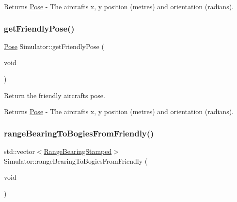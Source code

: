 \begin{DoxyReturn}{Returns}
\hyperlink{structPose}{Pose} -\/ The aircraft\textquotesingle{}s x, y position (metres) and orientation (radians). 
\end{DoxyReturn}
\mbox{\label{classSimulator_ab498029a37713969af417acfa7208d08}} 
\subsubsection{\texorpdfstring{get\+Friendly\+Pose()}{getFriendlyPose()}\hspace{0.1cm}{\footnotesize\ttfamily [2/2]}}
{\footnotesize\ttfamily \hyperlink{structPose}{Pose} Simulator\+::get\+Friendly\+Pose (\begin{DoxyParamCaption}\item[{void}]{ }\end{DoxyParamCaption})}



Return the friendly aircraft\textquotesingle{}s pose. 

\begin{DoxyReturn}{Returns}
\hyperlink{structPose}{Pose} -\/ The aircraft\textquotesingle{}s x, y position (metres) and orientation (radians). 
\end{DoxyReturn}
\mbox{\label{classSimulator_af78c417dd541bf1f671894f49739106f}} 
\subsubsection{\texorpdfstring{range\+Bearing\+To\+Bogies\+From\+Friendly()}{rangeBearingToBogiesFromFriendly()}\hspace{0.1cm}{\footnotesize\ttfamily [1/2]}}
{\footnotesize\ttfamily std\+::vector$<$\hyperlink{structRangeBearingStamped}{Range\+Bearing\+Stamped}$>$ Simulator\+::range\+Bearing\+To\+Bogies\+From\+Friendly (\begin{DoxyParamCaption}\item[{void}]{ }\end{DoxyParamCaption})}



